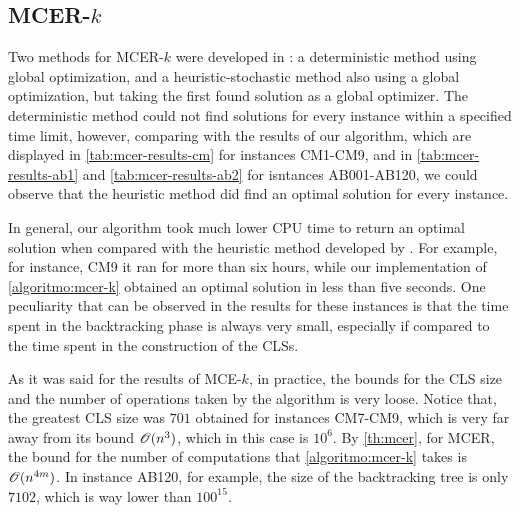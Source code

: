 \subsection{MCER-$k$}

Two methods for MCER-$k$ were developed in : a deterministic method using global optimization, and a heuristic-stochastic method also using a global optimization, but taking the first found solution as a global optimizer.
The deterministic method could not find solutions for every instance within a specified time limit, however, comparing with the results of our algorithm, which are displayed in \autoref{tab:mcer-results-cm} for instances CM1-CM9, and in \autoref{tab:mcer-results-ab1} and \autoref{tab:mcer-results-ab2} for isntances AB001-AB120, we could observe that the heuristic method did find an optimal solution for every instance.

In general, our algorithm took much lower CPU time to return an optimal solution when compared with the heuristic method developed by . For example, for instance, CM9 it ran for more than six hours, while our implementation of \autoref{algoritmo:mcer-k} obtained an optimal solution in less than five seconds. 
One peculiarity that can be observed in the results for these instances is that the time spent in the backtracking phase is always very small, especially if compared to the time spent in the construction of the CLSs. 

As it was said for the results of MCE-$k$, in practice, the bounds for the CLS size and the number of operations taken by the algorithm is very loose.
Notice that, the greatest CLS size was $701$ obtained for instances CM7-CM9, which is very far away from its bound $\mathscr{O}(n^3)$, which in this case is $10^6$. By \autoref{th:mcer}, for MCER, the bound for the number of computations that \autoref{algoritmo:mcer-k} takes is $\mathscr{O}(n^{4m})$. In instance AB120, for example, the size of the backtracking tree is only $7102$, which is way lower than $100^{15}$.

